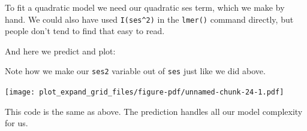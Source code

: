 \documentclass[
  letterpaper,
  DIV=11,
  numbers=noendperiod]{scrreprt}
\newenvironment{Shaded}{}{}
\newcommand{\AttributeTok}[1]{\textcolor[rgb]{0.49,0.56,0.16}{#1}}
\newcommand{\ConstantTok}[1]{\textcolor[rgb]{0.53,0.00,0.00}{#1}}
\newcommand{\DecValTok}[1]{\textcolor[rgb]{0.25,0.63,0.44}{#1}}
\newcommand{\FloatTok}[1]{\textcolor[rgb]{0.25,0.63,0.44}{#1}}
\newcommand{\FunctionTok}[1]{\textcolor[rgb]{0.02,0.16,0.49}{#1}}
\newcommand{\NormalTok}[1]{#1}
\newcommand{\OtherTok}[1]{\textcolor[rgb]{0.00,0.44,0.13}{#1}}
\newcommand{\SpecialCharTok}[1]{\textcolor[rgb]{0.25,0.44,0.63}{#1}}
\newcommand{\StringTok}[1]{\textcolor[rgb]{0.25,0.44,0.63}{#1}}
\begin{document}
To fit a quadratic model we need our quadratic ses term, which we make
by hand. We could also have used \texttt{I(ses\^{}2)} in the
\texttt{lmer()} command directly, but people don't tend to find that
easy to read.

And here we predict and plot:

\begin{Shaded}
\end{Shaded}

Note how we make our \texttt{ses2} variable out of \texttt{ses} just
like we did above.

\begin{Shaded}
\end{Shaded}

\texttt{[image: plot\_expand\_grid\_files/figure-pdf/unnamed-chunk-24-1.pdf]}

This code is the same as above. The prediction handles all our model
complexity for us.
\end{document}
